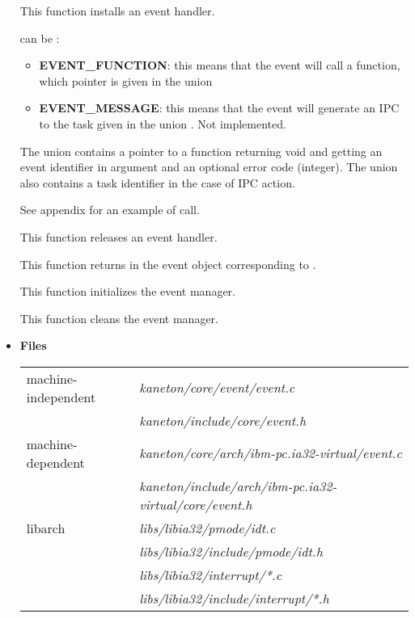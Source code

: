 \begin{itemize}
	 {
	   This function installs an event handler.

	    can be :
	   \begin{itemize}
	     \item
	       \textbf{EVENT\_FUNCTION}: this means that the event will
	       call a function, which pointer is given in the union
	     \item
	       \textbf{EVENT\_MESSAGE}: this means that the event will
	       generate an IPC to the task given in the union
	       . Not implemented.
	   \end{itemize}

	   The union  contains a pointer to a
	   function returning void and getting an event identifier in
	   argument and an optional error code (integer). The union
	   also contains a task identifier in the case of IPC action.

	   See appendix for an example of call.
	 }

	 {
	   This function releases an event handler.
	 }

	 {
	   This function returns in  the event object
	   corresponding to .
	 }

	 {
	   This function initializes the event manager.
	 }

	 {
	   This function cleans the event manager.
	 }

  \item {\bf {Files}}\\

    \begin{tabular}{| l | l |}
      \hline
      machine-independent & {\em kaneton/core/event/event.c}\\
      &  {\em kaneton/include/core/event.h}\\\hline
      machine-dependent & {\em kaneton/core/arch/ibm-pc.ia32-virtual/event.c}\\
      & {\em kaneton/include/arch/ibm-pc.ia32-virtual/core/event.h}\\\hline
      libarch & {\em libs/libia32/pmode/idt.c}\\
      & {\em libs/libia32/include/pmode/idt.h}\\
      & {\em libs/libia32/interrupt/*.c}\\
      & {\em libs/libia32/include/interrupt/*.h}\\\hline
    \end{tabular}
\end{itemize}


